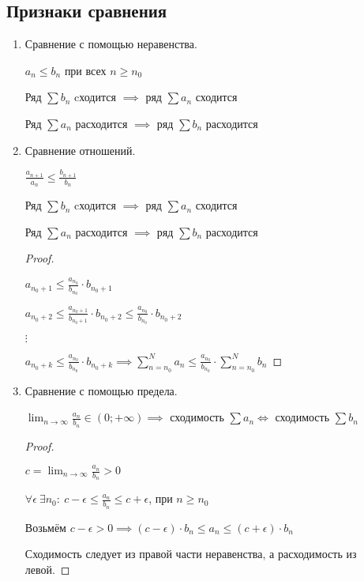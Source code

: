 \subsection{Признаки сравнения}
	\begin{enumerate}
	\item Сравнение с помощью неравенства.
	
	$a_n \leqslant b_n$ при всех $n \geqslant n_0$
	
	Ряд $\sum b_n$ cходится $\implies$ ряд $\sum a_n$ сходится
	
	Ряд $\sum a_n$ расходится $\implies$ ряд $\sum b_n$ расходится
	
	
	\item Сравнение отношений.
	
	$\frac{a_{n+1}}{a_n} \leqslant \frac{b_{n+1}}{b_n}$
	
	Ряд $\sum b_n$ cходится $\implies$ ряд $\sum a_n$ сходится
	
	Ряд $\sum a_n$ расходится $\implies$ ряд $\sum b_n$ расходится
	
	\begin{proof}~
	
	$a_{n_0+1} \leqslant \frac{a_{n_0}}{b_{n_0}}\cdot b_{n_0 + 1}$
	
	$a_{n_0+2} \leqslant \frac{a_{n_0 + 1}}{b_{n_0 + 1}}\cdot b_{n_0 + 2} \leqslant \frac{a_{n_0}}{b_{n_0}}\cdot b_{n_0 + 2}$
	
	$\vdots$
	
	$a_{n_0+k} \leqslant \frac{a_{n_0}}{b_{n_0}}\cdot b_{n_0 + k} \implies \sum_{n=n_0}^{N} a_n \leqslant \frac{a_{n_0}}{b_{n_0}}\cdot \sum_{n=n_0}^{N} b_n$
	\end{proof}

	\item Сравнение с помощью предела.
	
	$\lim_{n \to \infty} \frac{a_n}{b_n} \in (0; +\infty) \implies$ сходимость $\sum a_n \iff$ сходимость $\sum b_n$
	
	\begin{proof}~
		
	$c = \lim_{n \to \infty} \frac{a_n}{b_n} > 0$
	
	$\forall \epsilon\ \exists n_0:\ c - \epsilon \leqslant \frac{a_n}{b_n} \leqslant c + \epsilon$, при $n \geqslant n_0$
	
	Возьмём $c - \epsilon > 0 \implies (c - \epsilon)\cdot b_n \leqslant a_n \leqslant (c + \epsilon)\cdot b_n$
	
	Сходимость следует из правой части неравенства, а расходимость из левой. 
	\end{proof}
\end{enumerate}
